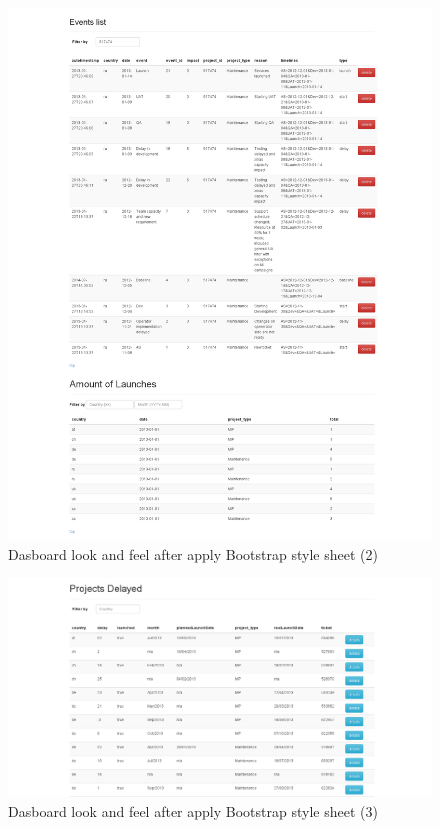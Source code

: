 \begin{figure}[ht!]
	\centering
   	\includegraphics[width=1\textwidth]{./resources/dashboard_after_bootstrap_2.png}
   	\caption{Dasboard look and feel after apply Bootstrap style sheet (2)}
   	\label{f_facelift_bootstrap_2}
\end{figure}

\begin{figure}[ht!]
	\centering
   	\includegraphics[width=1\textwidth]{./resources/dashboard_after_bootstrap_3.png}
   	\caption{Dasboard look and feel after apply Bootstrap style sheet (3)}
   	\label{f_facelift_bootstrap_3}
\end{figure}

